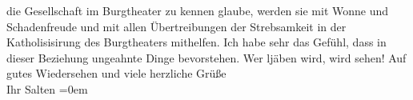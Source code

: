 \begin{ledgroupsized}[t]{13cm}
               die Gesellschaft im Burgtheater zu kennen glaube, werden sie mit Wonne und
               Schadenfreude und mit allen Übertreibungen der Strebsamkeit in der Katholisisirung
               des Burgtheaters mithelfen. Ich habe sehr das
               Gefühl, dass in dieser Beziehung ungeahnte Dinge bevorstehen. Wer ljäben wird, wird
               sehen!\pend
           \pstart
           Auf gutes Wiedersehen und viele herzliche Grüße {\\[\baselineskip]}Ihr \spacefill\mbox{Salten}\pend
           \leftskip=0em{}
         
         \endnumbering{}\end{ledgroupsized}\begin{anhang}\end{anhang}\newcommand{\dateiname}{L03559}\newcommand{\titel}{Felix Salten an Arthur Schnitzler, 2. 9. 1912}\newcommand{\editorInnen}{Martin Anton Müller und Laura Untner}
      